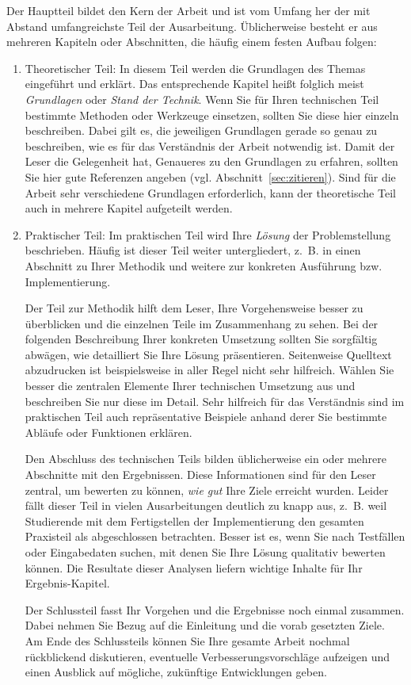 Der Hauptteil bildet den Kern der Arbeit und ist vom Umfang her der mit Abstand umfangreichste Teil der Ausarbeitung.
Üblicherweise besteht er  aus mehreren Kapiteln oder Abschnitten, die häufig einem festen Aufbau folgen:
\begin{enumerate}
\item Theoretischer Teil: In diesem Teil werden die Grundlagen des Themas eingeführt und erklärt. Das entsprechende Kapitel heißt folglich meist \textit{Grundlagen} oder \textit{Stand der Technik}. 
Wenn Sie für Ihren technischen Teil bestimmte Methoden oder Werkzeuge einsetzen, sollten Sie diese hier einzeln beschreiben.
Dabei gilt es, die jeweiligen Grundlagen gerade so genau zu beschreiben, wie es für das Verständnis der Arbeit notwendig ist.
Damit der Leser die Gelegenheit hat, Genaueres zu den Grundlagen zu erfahren, sollten Sie hier gute Referenzen angeben (vgl. Abschnitt~\ref{sec:zitieren}).
Sind für die Arbeit sehr verschiedene Grundlagen erforderlich, kann der theoretische Teil auch in mehrere Kapitel aufgeteilt werden. 
\item Praktischer Teil: Im praktischen Teil wird Ihre \textit{Lösung} der Problemstellung beschrieben. Häufig ist dieser Teil weiter untergliedert, z.~B. in einen Abschnitt zu Ihrer Methodik und weitere zur konkreten Ausführung bzw. Implementierung.

Der Teil zur Methodik hilft dem Leser, Ihre Vorgehensweise besser zu überblicken und die einzelnen Teile im Zusammenhang zu sehen.
Bei der folgenden Beschreibung Ihrer konkreten Umsetzung sollten Sie sorgfältig abwägen, wie detailliert Sie Ihre Lösung präsentieren.
Seitenweise Quelltext abzudrucken ist beispielsweise in aller Regel nicht sehr hilfreich.
Wählen Sie besser die zentralen Elemente Ihrer technischen Umsetzung aus und beschreiben Sie nur diese im Detail.
Sehr hilfreich für das Verständnis sind im praktischen Teil auch repräsentative Beispiele anhand derer Sie bestimmte Abläufe oder Funktionen erklären.

Den Abschluss des technischen Teils bilden üblicherweise ein oder mehrere Abschnitte mit den Ergebnissen.
Diese Informationen sind für den Leser zentral, um bewerten zu können, \textit{wie gut} Ihre Ziele erreicht wurden.
Leider fällt dieser Teil in vielen Ausarbeitungen deutlich zu knapp aus, z.~B. weil Studierende mit dem Fertigstellen der Implementierung den gesamten Praxisteil als abgeschlossen betrachten.
Besser ist es, wenn Sie nach Testfällen oder Eingabedaten suchen, mit denen Sie Ihre Lösung qualitativ bewerten können.
Die Resultate dieser Analysen liefern wichtige Inhalte für Ihr Ergebnis-Kapitel.

Der Schlussteil fasst Ihr Vorgehen und die Ergebnisse noch einmal zusammen.
Dabei nehmen Sie Bezug auf die Einleitung und die vorab gesetzten Ziele.
Am Ende des Schlussteils können Sie Ihre gesamte Arbeit nochmal rückblickend diskutieren, eventuelle Verbesserungsvorschläge aufzeigen und einen Ausblick auf mögliche, zukünftige Entwicklungen geben.
\end{enumerate}

